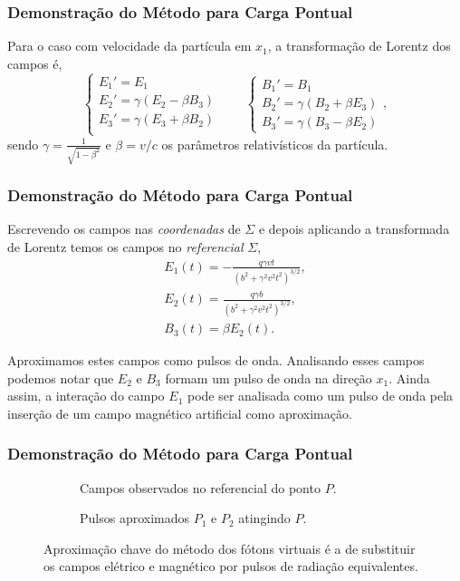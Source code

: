 \documentclass[xcolor=dvipsnames]{beamer}
\begin{document}
\begin{frame}
	\frametitle{Demonstração do Método para Carga Pontual}
	Para o caso com velocidade da partícula em $x_1$, a transformação de
	Lorentz dos campos é,
	\begin{equation}
		\label{eq_field_trans}
		\begin{cases}
		E_1' = E_1 \\
		E_2' = \gamma (E_2 - \beta B_3) \\
		E_3' = \gamma (E_3 + \beta B_2) \\
		\end{cases} \qquad
		\begin{cases}
		B_1 ' = B_1 \\
		B_2 ' = \gamma (B_2 + \beta E_3) \\
		B_3' = \gamma(B_3 - \beta E_2)
		\end{cases},
	\end{equation}
	sendo $\displaystyle \gamma = \frac{1}{\sqrt{1-\beta ^2}}$ e $\beta = v/c$
	os parâmetros relativísticos da partícula.
\end{frame}

\begin{frame}
	\frametitle{Demonstração do Método para Carga Pontual}
	Escrevendo os campos nas \textit{coordenadas} de $\Sigma$ e depois
	aplicando a transformada de Lorentz temos os campos no \textit{referencial}
	$\Sigma$,
	\begin{gather}
		E_1 (t) = -\frac{q\gamma vt}{(b^2 + \gamma ^2 v^2t^2)^{3/2}}
			\label{eq_field1},\\
		E_2 (t) = \frac{q\gamma b}{(b^2 + \gamma ^2 v^2 t
			^2)^{3/2}}\label{eq_field2},\\ 
		B_3 (t) = \beta E_2(t) \label{eq_field3}.
	\end{gather}
	\begin{block}{Aproximamos estes campos como pulsos de onda.}
		Analisando esses campos podemos notar que $E_2$ e $B_3$ formam um pulso
		de onda na direção $x_1$. Ainda assim, a interação do campo $E_1$ pode
		ser analisada como um pulso de onda pela inserção de um campo magnético
		artificial como aproximação.
	\end{block}
\end{frame}

\begin{frame}
	\frametitle{Demonstração do Método para Carga Pontual}
	\begin{figure}
		\begin{subfigure}[b]{0.4\textwidth}
			\centering
			
			\caption{Campos observados no referencial do ponto $P$.}
		\end{subfigure}
		\hspace{1cm}
		\begin{subfigure}[b]{0.4\textwidth}
			\centering
			
			\caption{Pulsos aproximados $P_1$ e $P_2$ atingindo $P$.}
		\end{subfigure}
		\caption{Aproximação chave do método dos fótons virtuais é a de
		substituir os campos elétrico e magnético por pulsos de radiação
		equivalentes.}
	\end{figure}
\end{frame}
\end{document}
